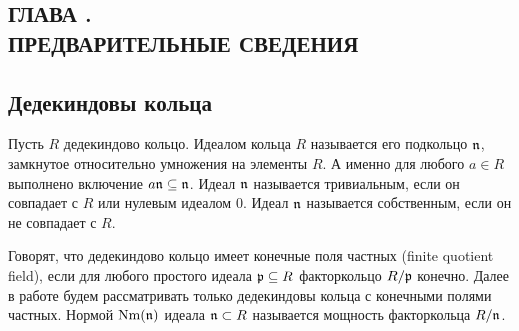 \documentclass[_00_dissertation.tex]{subfiles}
\begin{document}
\onlyinsubfile{
    \renewcommand{\contentsname}{ОГЛАВЛЕНИЕ}
    \setcounter{tocdepth}{3}
    \tableofcontents
}

\newpage
\begin{center}
    \section*{ГЛАВА .\\ ПРЕДВАРИТЕЛЬНЫЕ СВЕДЕНИЯ}\label{ch:Prelimiaries}
\end{center}

\subsection{Дедекиндовы кольца}

Пусть $R$ дедекиндово кольцо.
Идеалом кольца $R$ называется его подкольцо $\mathfrak{n}$, замкнутое относительно умножения на элементы $R$.
А именно для любого $a \in R$ выполнено включение $a\mathfrak{n} \subseteq \mathfrak{n}$.
Идеал $\mathfrak{n}$ называется тривиальным, если он совпадает с $R$ или нулевым идеалом $0$.
Идеал $\mathfrak{n}$ называется собственным, если он не совпадает с $R$.

Говорят, что дедекиндово кольцо имеет конечные поля частных (finite quotient field), если для любого простого идеала $\mathfrak{p} \subseteq R$ факторкольцо $R/\mathfrak{p}$ конечно.
Далее в работе будем рассматривать только дедекиндовы кольца с конечными полями частных.
Нормой $\textrm{Nm}(\mathfrak{n})$ идеала $\mathfrak{n} \subset R$ называется мощность факторкольца $R/\mathfrak{n}$.
\end{document}
